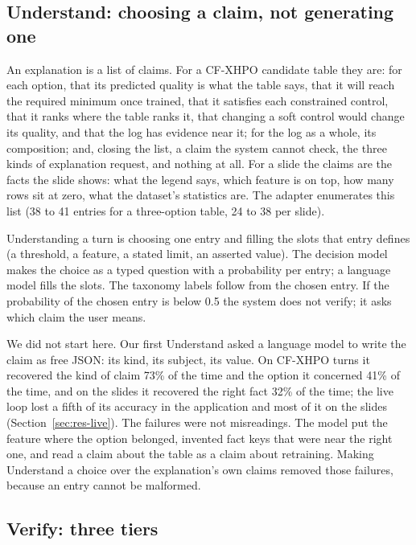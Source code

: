 \documentclass[preprint,12pt,3p,times]{elsarticle}
\begin{document}
\subsection{Understand: choosing a claim, not generating one}
\label{sec:understand}

An explanation is a list of claims. For a CF-XHPO candidate table they are: for each option, that its predicted quality is what the table says, that it will reach the required minimum once trained, that it satisfies each constrained control, that it ranks where the table ranks it, that changing a soft control would change its quality, and that the log has evidence near it; for the log as a whole, its composition; and, closing the list, a claim the system cannot check, the three kinds of explanation request, and nothing at all. For a slide the claims are the facts the slide shows: what the legend says, which feature is on top, how many rows sit at zero, what the dataset's statistics are. The adapter enumerates this list (38 to 41 entries for a three-option table, 24 to 38 per slide).

Understanding a turn is choosing one entry and filling the slots that entry defines (a threshold, a feature, a stated limit, an asserted value). The decision model makes the choice as a typed question with a probability per entry; a language model fills the slots. The taxonomy labels follow from the chosen entry. If the probability of the chosen entry is below 0.5 the system does not verify; it asks which claim the user means.

We did not start here. Our first Understand asked a language model to write the claim as free JSON: its kind, its subject, its value. On CF-XHPO turns it recovered the kind of claim 73\% of the time and the option it concerned 41\% of the time, and on the slides it recovered the right fact 32\% of the time; the live loop lost a fifth of its accuracy in the application and most of it on the slides (Section~\ref{sec:res-live}). The failures were not misreadings. The model put the feature where the option belonged, invented fact keys that were near the right one, and read a claim about the table as a claim about retraining. Making Understand a choice over the explanation's own claims removed those failures, because an entry cannot be malformed.

\subsection{Verify: three tiers}
\label{sec:verify}
\end{document}
